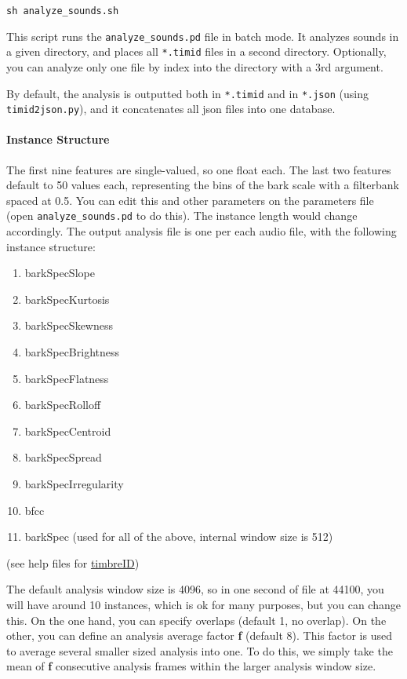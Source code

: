 \texttt{sh\ analyze\_sounds.sh}

This script runs the \texttt{analyze\_sounds.pd} file in batch mode. It analyzes sounds in a given directory, and places all \texttt{*.timid} files in a second directory. Optionally, you can analyze only one file by index into the directory with a 3rd argument.

By default, the analysis is outputted both in \texttt{*.timid} and in \texttt{*.json} (using \texttt{timid2json.py}), and it concatenates all \gls{json} files into one database.


\paragraph{Instance Structure}

The first nine features are single-valued, so one float each. The last two features default to 50 values each, representing the bins of the bark scale with a filterbank spaced at 0.5. You can edit this and other parameters on the parameters file (open \texttt{analyze\_sounds.pd} to do this). The instance length would change accordingly. The output analysis file is one per each audio file, with the following instance structure:

\begin{enumerate}
  \singlespacing
\tightlist
\item
  barkSpecSlope
\item
  barkSpecKurtosis
\item
  barkSpecSkewness
\item
  barkSpecBrightness
\item
  barkSpecFlatness
\item
  barkSpecRolloff
\item
  barkSpecCentroid
\item
  barkSpecSpread
\item
  barkSpecIrregularity
\item
  bfcc
\item
  barkSpec (used for all of the above, internal window size is 512)
\end{enumerate}

(see help files for \href{https://github.com/wbrent/timbreID}{timbreID})

The default analysis window size is 4096, so in one second of file at 44100, you will have around 10 instances, which is ok for many purposes, but you can change this. On the one hand, you can specify overlaps (default 1, no overlap). On the other, you can define an analysis average factor \textbf{f} (default 8). This factor is used to average several smaller sized analysis into one. To do this, we simply take the mean of \textbf{f} consecutive analysis frames within the larger analysis window size.



